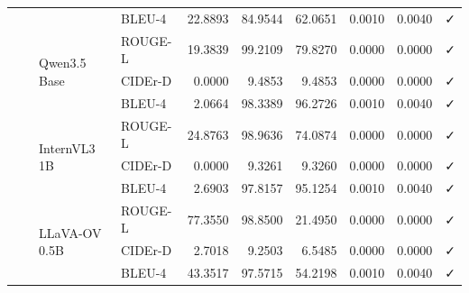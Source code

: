 \begin{tabular}{llllrrrrrl}
 &  &  & BLEU-4 & 22.8893 & 84.9544 & 62.0651 & 0.0010 & 0.0040 & ✓ \\
\cline{3-10}
 &  & \multirow[t]{3}{*}{Qwen3.5 Base} & ROUGE-L & 19.3839 & 99.2109 & 79.8270 & 0.0000 & 0.0000 & ✓ \\
 &  &  & CIDEr-D & 0.0000 & 9.4853 & 9.4853 & 0.0000 & 0.0000 & ✓ \\
 &  &  & BLEU-4 & 2.0664 & 98.3389 & 96.2726 & 0.0010 & 0.0040 & ✓ \\
\cline{3-10}
 &  & \multirow[t]{3}{*}{InternVL3 1B} & ROUGE-L & 24.8763 & 98.9636 & 74.0874 & 0.0000 & 0.0000 & ✓ \\
 &  &  & CIDEr-D & 0.0000 & 9.3261 & 9.3260 & 0.0000 & 0.0000 & ✓ \\
 &  &  & BLEU-4 & 2.6903 & 97.8157 & 95.1254 & 0.0010 & 0.0040 & ✓ \\
\cline{3-10}
 &  & \multirow[t]{3}{*}{LLaVA-OV 0.5B} & ROUGE-L & 77.3550 & 98.8500 & 21.4950 & 0.0000 & 0.0000 & ✓ \\
 &  &  & CIDEr-D & 2.7018 & 9.2503 & 6.5485 & 0.0000 & 0.0000 & ✓ \\
 &  &  & BLEU-4 & 43.3517 & 97.5715 & 54.2198 & 0.0010 & 0.0040 & ✓ \\
\cline{1-10} \cline{2-10} \cline{3-10}
\bottomrule
\end{tabular}
